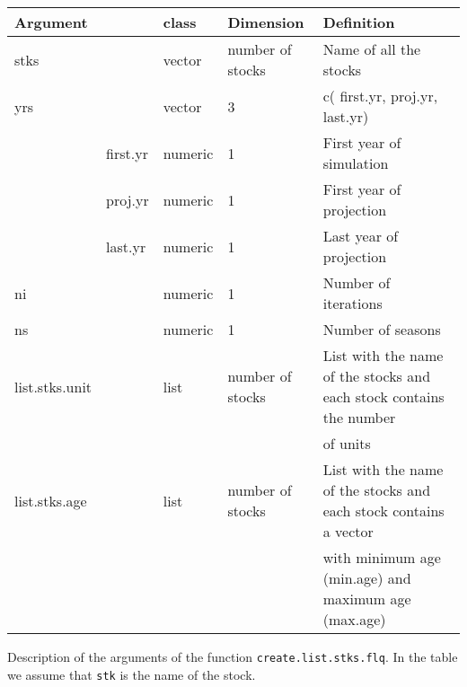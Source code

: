 \begin{landscape}
\begin{table}[!ht]
\begin{footnotesize}
    \begin{tabular}{lllll} %
      \hline 
      Argument & & class & Dimension & Definition\\
      \hline
      stks & & vector & number of stocks &	Name of all the stocks\\
      yrs & & vector & 3 &	c( first.yr, proj.yr, last.yr)\\
        & first.yr & numeric & 1 & First year of simulation\\
        & proj.yr  & numeric & 1 & First year of projection\\
        & last.yr  & numeric & 1 & Last year of projection\\
      ni & & numeric &	1 &	Number of iterations\\
      ns & & numeric &	1 &	Number of seasons\\
      list.stks.unit & & list & number of stocks &	List with the name of the stocks and each stock contains the number\\
       & & & & of units\\
      list.stks.age & & list & number of stocks &	List with the name of the stocks and each stock contains a vector \\
       & & & & with minimum age (min.age) and maximum age (max.age)\\
      \hline
    \end{tabular}
      
  \end{footnotesize}

\end{table}



\begin{table}[!ht]

  \centering
  \begin{footnotesize}
    
    \caption{Description of the arguments of the function \texttt{create.list.stks.flq}. 
      In the table we assume that \texttt{stk} is the name of the stock.}
    
    \label{tb:A4.table8}
    

\end{footnotesize}
\end{table}
\end{landscape}
